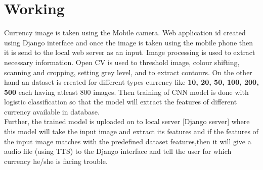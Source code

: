 \section{Working}
Currency image is taken using the Mobile camera. Web application id created using Django interface and once the image is taken using the mobile phone then it is send to the local web server as an input. Image processing is used to extract necessary information. Open CV is used to threshold image, colour shifting, scanning and cropping, setting grey level, and to extract contours. On the other hand an dataset is created for different types currency like {\bf 10, 20, 50, 100, 200, 500} each having atleast 800 images. Then training of CNN model is done with logistic classification so that the model will extract the features of different currency available in database.\\
Further, the trained model is uploaded on to local server [Django server] where this model will take the input image and extract its features and if the features of the input image matches with the predefined dataset features,then it will give a audio file (using TTS) to the Django interface and tell the user for which currency he/she is facing trouble. \citeauthor{9020096}\\


